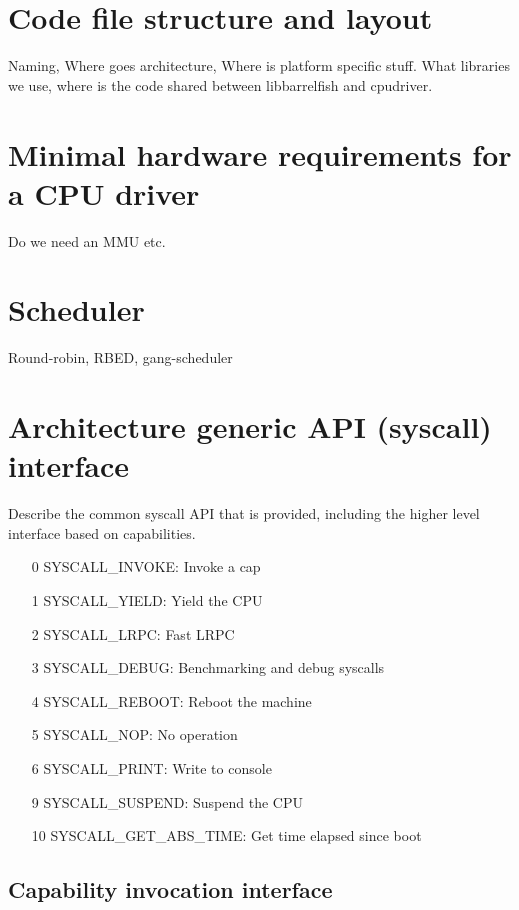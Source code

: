 \documentclass[a4paper,11pt,twoside]{report}
\begin{document}
{{\section{Code file structure and layout}
Naming, Where goes architecture, Where is platform specific stuff.
What libraries we use, where is the code shared between libbarrelfish
and cpudriver.

\section{Minimal hardware requirements for a CPU driver}
Do we need an MMU etc.

\section{Scheduler}
Round-robin, RBED, gang-scheduler

\section{Architecture generic API (syscall) interface}
Describe the common syscall API that is provided, including
the higher level interface based on capabilities.

\begin{itemize}
\item[0] SYSCALL\_INVOKE: Invoke a cap
\item[1] SYSCALL\_YIELD: Yield the CPU
\item[2] SYSCALL\_LRPC: Fast LRPC
\item[3] SYSCALL\_DEBUG: Benchmarking and debug syscalls
\item[4] SYSCALL\_REBOOT: Reboot the machine
\item[5] SYSCALL\_NOP: No operation
\item[6] SYSCALL\_PRINT: Write to console
\item[9] SYSCALL\_SUSPEND: Suspend the CPU
\item[10] SYSCALL\_GET\_ABS\_TIME: Get time elapsed since boot

\end{itemize}

\subsection{Capability invocation interface}

}}
\end{document}
